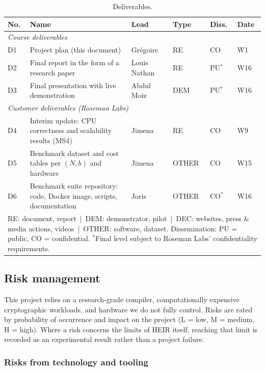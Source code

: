 \begin{table}[H]
\centering
\small
\caption{Deliverables.}
\label{tab:deliverables}
\begin{tabularx}{\textwidth}{l >{\raggedright\arraybackslash}X l l l l}
\toprule
\textbf{No.} & \textbf{Name} & \textbf{Lead} & \textbf{Type} & \textbf{Diss.} & \textbf{Date}\\
\midrule
\multicolumn{6}{l}{\textit{Course deliverables}}\\
D1 & Project plan (this document) & Grégoire & RE & CO & W1\\
D2 & Final report in the form of a research paper & Louis Nathan & RE & PU$^{*}$ & W16\\
D3 & Final presentation with live demonstration & Abdul Moiz & DEM & PU$^{*}$ & W16\\
\midrule
\multicolumn{6}{l}{\textit{Customer deliverables (Roseman Labs)}}\\
D4 & Interim update: CPU correctness and scalability results (MS4) & Jimena & RE & CO & W9\\
D5 & Benchmark dataset and cost tables per $(N, b)$ and hardware & Jimena & OTHER & CO & W15\\
D6 & Benchmark suite repository: code, Docker image, scripts, documentation & Joris & OTHER & CO$^{*}$ & W16\\
\midrule
\multicolumn{6}{p{0.95\textwidth}}{\footnotesize RE: document, report \,|\, DEM: demonstrator, pilot \,|\, DEC: websites, press \& media actions, videos \,|\, OTHER: software, dataset. Dissemination: PU = public, CO = confidential. $^{*}$Final level subject to Roseman Labs' confidentiality requirements.}\\
\bottomrule
\end{tabularx}
\end{table}

\subsection{Risk management}                            %
\medskip
This project relies on a research-grade compiler, computationally expensive
cryptographic workloads, and hardware we do not fully control. Risks are rated
by probability of occurrence and impact on the project (L = low, M = medium,
H = high). Where a risk concerns the limits of HEIR itself, reaching that limit is recorded as an experimental result rather than a project failure.


\subsubsection*{Risks from technology and tooling}
  
